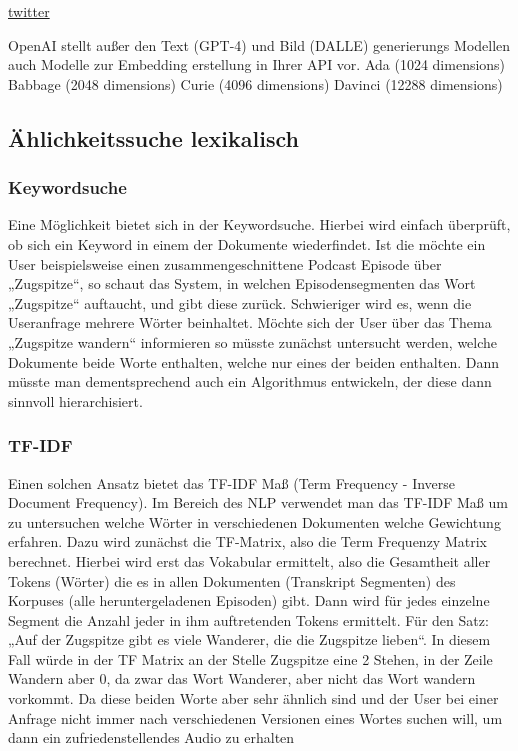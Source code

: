 \href{https://twitter.com/Nils_Reimers/status/1487014195568775173}{twitter}



OpenAI stellt außer den Text (GPT-4) und Bild (DALLE) generierungs Modellen auch Modelle zur Embedding erstellung in Ihrer API vor.
Ada (1024 dimensions)
Babbage (2048 dimensions)
Curie (4096 dimensions)
Davinci (12288 dimensions)





\subsection{Ählichkeitssuche lexikalisch}

\subsubsection{Keywordsuche}

Eine Möglichkeit bietet sich in der Keywordsuche. 
Hierbei wird einfach überprüft, ob sich ein Keyword in einem der Dokumente wiederfindet. Ist die möchte ein User beispielsweise einen zusammengeschnittene Podcast Episode über „Zugspitze“, so schaut das System, in welchen Episodensegmenten das Wort „Zugspitze“ auftaucht, und gibt diese zurück. 
Schwieriger wird es, wenn die Useranfrage mehrere Wörter beinhaltet. 
Möchte sich der User über das Thema „Zugspitze wandern“ informieren so müsste zunächst untersucht werden, welche Dokumente beide Worte enthalten, welche nur eines der beiden enthalten. 
Dann müsste man dementsprechend auch ein Algorithmus entwickeln, der diese dann sinnvoll hierarchisiert. 

\subsubsection{TF-IDF}

Einen solchen Ansatz bietet das TF-IDF Maß (Term Frequency - Inverse Document Frequency). 
Im Bereich des NLP verwendet man das TF-IDF Maß um zu untersuchen welche Wörter in verschiedenen Dokumenten welche Gewichtung erfahren. 
Dazu wird zunächst die TF-Matrix, also die Term Frequenzy Matrix berechnet. 
Hierbei wird erst das Vokabular ermittelt, also die Gesamtheit aller Tokens (Wörter) die es in allen Dokumenten (Transkript Segmenten) des Korpuses (alle heruntergeladenen Episoden) gibt. 
Dann wird für jedes einzelne Segment die Anzahl jeder in ihm auftretenden Tokens ermittelt. 
Für den Satz: „Auf der Zugspitze gibt es viele Wanderer, die die Zugspitze lieben“. 
In diesem Fall würde in der TF Matrix an der Stelle Zugspitze eine 2 Stehen, in der Zeile Wandern aber 0, da zwar das Wort Wanderer, aber nicht das Wort wandern vorkommt. 
Da diese beiden Worte aber sehr ähnlich sind und der User bei einer Anfrage nicht immer nach verschiedenen Versionen eines Wortes suchen will, um dann ein zufriedenstellendes Audio zu erhalten

